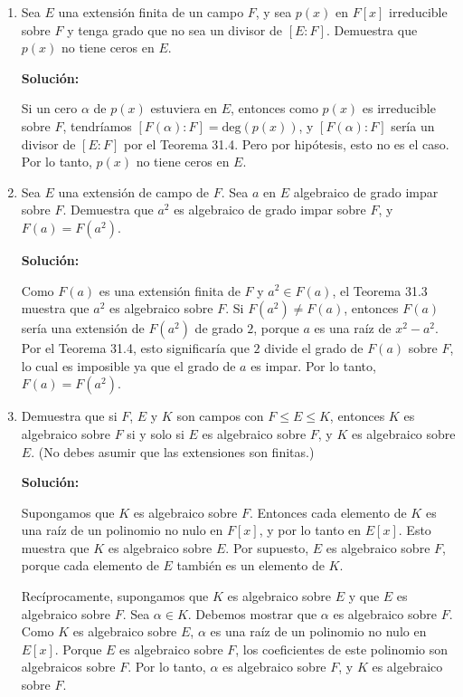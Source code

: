 \begin{enumerate}
    \item Sea $E$ una extensión finita de un campo $F$, y sea $p(x)$ en $F[x]$ irreducible sobre $F$ y tenga grado que no sea un divisor de $[E : F]$. Demuestra que $p(x)$ no tiene ceros en $E$.
    
    \textbf{Solución:}
    
    Si un cero $\alpha$ de $p(x)$ estuviera en $E$, entonces como $p(x)$ es irreducible sobre $F$, tendríamos $[F(\alpha) : F] = \text{deg}(p(x))$, y $[F(\alpha) : F]$ sería un divisor de $[E : F]$ por el Teorema 31.4. Pero por hipótesis, esto no es el caso. Por lo tanto, $p(x)$ no tiene ceros en $E$.
    
    \item Sea $E$ una extensión de campo de $F$. Sea $a$ en $E$ algebraico de grado impar sobre $F$. Demuestra que $a^2$ es algebraico de grado impar sobre $F$, y $F(a) = F(a^2)$.
    
    \textbf{Solución:}
    
    Como $F(a)$ es una extensión finita de $F$ y $a^2 \in F(a)$, el Teorema 31.3 muestra que $a^2$ es algebraico sobre $F$. Si $F(a^2) \neq F(a)$, entonces $F(a)$ sería una extensión de $F(a^2)$ de grado $2$, porque $a$ es una raíz de $x^2 - a^2$. Por el Teorema 31.4, esto significaría que $2$ divide el grado de $F(a)$ sobre $F$, lo cual es imposible ya que el grado de $a$ es impar. Por lo tanto, $F(a) = F(a^2)$.
    
    \item Demuestra que si $F$, $E$ y $K$ son campos con $F \leq E \leq K$, entonces $K$ es algebraico sobre $F$ si y solo si $E$ es algebraico sobre $F$, y $K$ es algebraico sobre $E$. (No debes asumir que las extensiones son finitas.)
    
    \textbf{Solución:}
    
    Supongamos que $K$ es algebraico sobre $F$. Entonces cada elemento de $K$ es una raíz de un polinomio no nulo en $F[x]$, y por lo tanto en $E[x]$. Esto muestra que $K$ es algebraico sobre $E$. Por supuesto, $E$ es algebraico sobre $F$, porque cada elemento de $E$ también es un elemento de $K$.
    
    Recíprocamente, supongamos que $K$ es algebraico sobre $E$ y que $E$ es algebraico sobre $F$. Sea $\alpha \in K$. Debemos mostrar que $\alpha$ es algebraico sobre $F$. Como $K$ es algebraico sobre $E$, $\alpha$ es una raíz de un polinomio no nulo en $E[x]$. Porque $E$ es algebraico sobre $F$, los coeficientes de este polinomio son algebraicos sobre $F$. Por lo tanto, $\alpha$ es algebraico sobre $F$, y $K$ es algebraico sobre $F$.
    

\end{enumerate}
